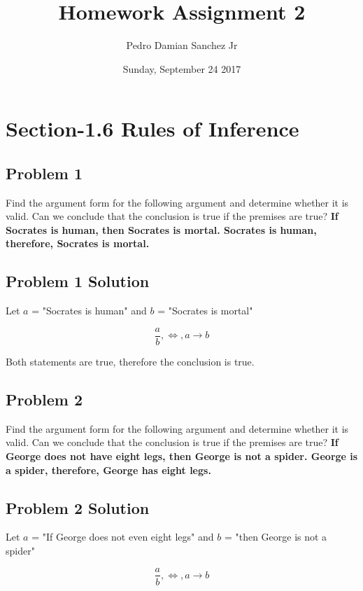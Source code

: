 \documentclass[11pt]{article}
\title{\bf Homework Assignment 2}
\date{Sunday, September 24 2017}
\author{ Pedro Damian Sanchez Jr}
\begin{document}
\maketitle

\section{Section-1.6 Rules of Inference}

\subsection{Problem 1}

Find the argument form for the following argument and determine whether it is valid. Can we conclude that the conclusion is true if the premises are true? {\bf If Socrates is human, then Socrates is mortal. Socrates is human, therefore, Socrates is mortal.}

\subsection{Problem 1 Solution}

Let $a$ = "Socrates is human" and $b$ = "Socrates is mortal"

\begin{displaymath}
	\frac{a}{b}, \iff, a \to b
\end{displaymath}

Both statements are true, therefore the conclusion is true.

\subsection{Problem 2}

Find the argument form for the following argument and determine whether it is valid. Can we conclude that the conclusion is true if the premises are true? {\bf If George does not have eight legs, then George is not a spider. George is a spider, therefore, George has eight legs.}

\subsection{Problem 2 Solution}

Let $a$ = "If George does not even eight legs" and $b$ = "then George is not a spider"

\begin{displaymath}
	\frac{a}{b}, \iff, a \to b
\end{displaymath}
\end{document}
